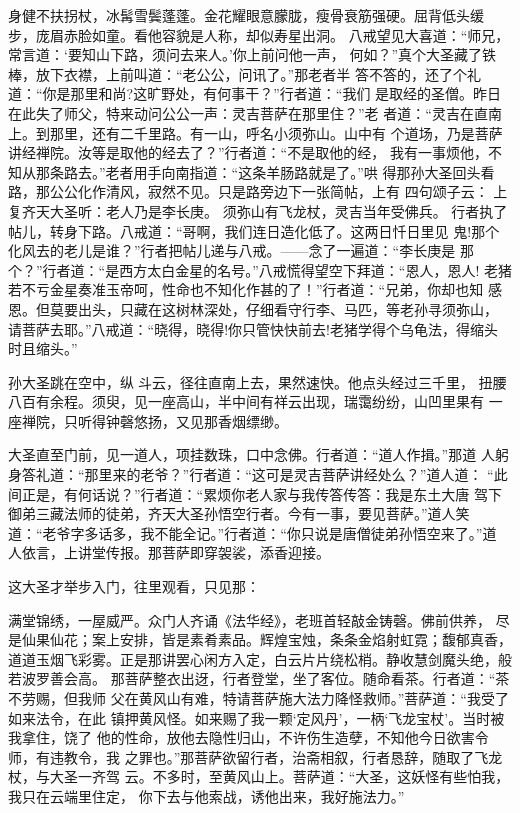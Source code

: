 身健不扶拐杖，冰髯雪鬓蓬蓬。金花耀眼意朦胧，瘦骨衰筋强硬。屈背低头缓
步，庞眉赤脸如童。看他容貌是人称，却似寿星出洞。
八戒望见大喜道：“师兄，常言道：‘要知山下路，须问去来人。’你上前问他一声，
何如？”真个大圣藏了铁棒，放下衣襟，上前叫道：“老公公，问讯了。”那老者半
答不答的，还了个礼道：“你是那里和尚?这旷野处，有何事干？”行者道：“我们
是取经的圣僧。昨日在此失了师父，特来动问公公一声：灵吉菩萨在那里住？”老
者道：“灵吉在直南上。到那里，还有二千里路。有一山，呼名小须弥山。山中有
个道场，乃是菩萨讲经禅院。汝等是取他的经去了？”行者道：“不是取他的经，
我有一事烦他，不知从那条路去。”老者用手向南指道：“这条羊肠路就是了。”哄
得那孙大圣回头看路，那公公化作清风，寂然不见。只是路旁边下一张简帖，上有
四句颂子云：
上复齐天大圣听：老人乃是李长庚。
须弥山有飞龙杖，灵吉当年受佛兵。
行者执了帖儿，转身下路。八戒道：“哥啊，我们连日造化低了。这两日忏日里见
鬼!那个化风去的老儿是谁？”行者把帖儿递与八戒。——念了一遍道：“李长庚是
那个？”行者道：“是西方太白金星的名号。”八戒慌得望空下拜道：“恩人，恩人!
老猪若不亏金星奏准玉帝呵，性命也不知化作甚的了！”行者道：“兄弟，你却也知
感恩。但莫要出头，只藏在这树林深处，仔细看守行李、马匹，等老孙寻须弥山，
请菩萨去耶。”八戒道：“晓得，晓得!你只管快快前去!老猪学得个乌龟法，得缩头
时且缩头。”

孙大圣跳在空中，纵斗云，径往直南上去，果然速快。他点头经过三千里，
扭腰八百有余程。须臾，见一座高山，半中间有祥云出现，瑞霭纷纷，山凹里果有
一座禅院，只听得钟磬悠扬，又见那香烟缥缈。

大圣直至门前，见一道人，项挂数珠，口中念佛。行者道：“道人作揖。”那道
人躬身答礼道：“那里来的老爷？”行者道：“这可是灵吉菩萨讲经处么？”道人道：
“此间正是，有何话说？”行者道：“累烦你老人家与我传答传答：我是东土大唐
驾下御弟三藏法师的徒弟，齐天大圣孙悟空行者。今有一事，要见菩萨。”道人笑
道：“老爷字多话多，我不能全记。”行者道：“你只说是唐僧徒弟孙悟空来了。”道
人依言，上讲堂传报。那菩萨即穿袈裟，添香迎接。

这大圣才举步入门，往里观看，只见那：

满堂锦绣，一屋威严。众门人齐诵《法华经》，老班首轻敲金铸磬。佛前供养，
尽是仙果仙花；案上安排，皆是素肴素品。辉煌宝烛，条条金焰射虹霓；馥郁真香，
道道玉烟飞彩雾。正是那讲罢心闲方入定，白云片片绕松梢。静收慧剑魔头绝，般
若波罗善会高。
那菩萨整衣出迓，行者登堂，坐了客位。随命看茶。行者道：“茶不劳赐，但我师
父在黄风山有难，特请菩萨施大法力降怪救师。”菩萨道：“我受了如来法令，在此
镇押黄风怪。如来赐了我一颗‘定风丹’，一柄‘飞龙宝杖’。当时被我拿住，饶了
他的性命，放他去隐性归山，不许伤生造孽，不知他今日欲害令师，有违教令，我
之罪也。”那菩萨欲留行者，治斋相叙，行者恳辞，随取了飞龙杖，与大圣一齐驾
云。不多时，至黄风山上。菩萨道：“大圣，这妖怪有些怕我，我只在云端里住定，
你下去与他索战，诱他出来，我好施法力。”

